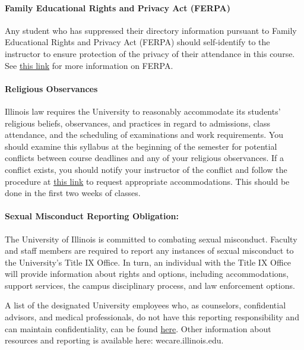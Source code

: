 \documentclass[11pt, a4paper]{article}
\begin{document}
\paragraph{Family Educational Rights and Privacy Act (FERPA)}
Any student who has suppressed their directory information pursuant to Family 
Educational Rights and Privacy Act (FERPA) should self-identify to the 
instructor to ensure protection of the privacy of their attendance in this 
course. See \href{https://registrar.illinois.edu/academic-records/ferpa/}{this 
link} for more information on FERPA.

\paragraph{Religious Observances}
Illinois law requires the University to reasonably accommodate its students' 
religious beliefs, observances, and practices in regard to admissions, class 
attendance, and the scheduling of examinations and work requirements. You 
should examine this syllabus at the beginning of the semester for potential 
conflicts between course deadlines and any of your religious observances. If a 
conflict exists, you should notify your instructor of the conflict and follow 
the procedure at 
\href{https://odos.illinois.edu/community-of-care/resources/students/religious-observances/}{this 
link} to request appropriate accommodations. This should be done in the first two weeks of classes.

\paragraph{Sexual Misconduct Reporting Obligation:} The University of Illinois is committed to combating sexual misconduct. Faculty and staff members are required to report any instances of sexual misconduct to the University’s Title IX Office. In turn, an individual with the Title IX Office will provide information about rights and options, including accommodations, support services, the campus disciplinary process, and law enforcement options.

A list of the designated University employees who, as counselors, confidential 
advisors, and medical professionals, do not have this reporting responsibility 
and can maintain confidentiality, can be found 
\href{https://wecare.illinois.edu/resources/students/#confidential}{here}.
Other information about resources and reporting is available here: wecare.illinois.edu.
\end{document}
